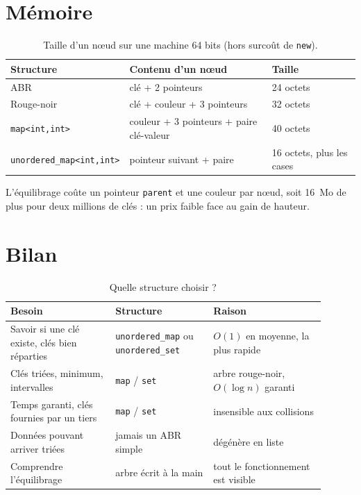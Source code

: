\documentclass[12pt,a4paper]{report}
\begin{document}
\section{Mémoire}
\begin{table}[H]
\centering
\caption{Taille d'un nœud sur une machine 64 bits (hors surcoût de \texttt{new}).}
\footnotesize
\begin{tabular}{lll}
  \toprule
  Structure & Contenu d'un nœud & Taille \\
  \midrule
  ABR & clé + 2 pointeurs & 24 octets \\
  Rouge-noir & clé + couleur + 3 pointeurs & 32 octets \\
  \texttt{map<int,int>} & couleur + 3 pointeurs + paire clé-valeur & 40 octets \\
  \texttt{unordered\_map<int,int>} & pointeur suivant + paire & 16 octets, plus les cases \\
  \bottomrule
\end{tabular}
\end{table}
L'équilibrage coûte un pointeur \texttt{parent} et une couleur par nœud, soit 16~Mo de plus pour deux millions de clés : un prix faible face au gain de hauteur.

\section{Bilan}
\begin{table}[H]
\centering
\caption{Quelle structure choisir ?}
\small
\begin{tabular}{p{0.30\linewidth}p{0.28\linewidth}p{0.32\linewidth}}
  \toprule
  Besoin & Structure & Raison \\
  \midrule
  Savoir si une clé existe, clés bien réparties & \texttt{unordered\_map} ou \texttt{unordered\_set} & $O(1)$ en moyenne, la plus rapide \\
  Clés triées, minimum, intervalles & \texttt{map} / \texttt{set} & arbre rouge-noir, $O(\log n)$ garanti \\
  Temps garanti, clés fournies par un tiers & \texttt{map} / \texttt{set} & insensible aux collisions \\
  Données pouvant arriver triées & jamais un ABR simple & dégénère en liste \\
  Comprendre l'équilibrage & arbre écrit à la main & tout le fonctionnement est visible \\
  \bottomrule
\end{tabular}
\end{table}
\end{document}
